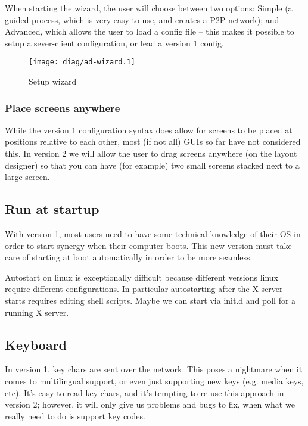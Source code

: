When starting the wizard, the user will choose between two options: Simple (a
guided process, which is very easy to use, and creates a P2P network); and
Advanced, which allows the user to load a config file -- this makes it possible
to setup a sever-client configuration, or lead a version 1 config.

\clearpage
\begin{figure}[ht!]
  \centering
  \texttt{[image: diag/ad-wizard.1]}
  \caption{Setup wizard}
  \label{fig:setupWizard}
\end{figure}

\subsubsection{Place screens anywhere}

While the version 1 configuration syntax does allow for screens to be placed at
positions relative to each other, most (if not all) GUIs so far have not 
considered this. In version 2 we will allow the user to drag screens anywhere
(on the layout designer) so that you can have (for example) two small screens
stacked next to a large screen.

\subsection{Run at startup}

With version 1, most users need to have some technical knowledge of their OS
in order to start synergy when their computer boots. This new version must
take care of starting at boot automatically in order to be more seamless.

Autostart on linux is exceptionally difficult because different versions linux 
require different configurations. In particular autostarting after the X server
starts requires editing shell scripts. Maybe we can start via init.d and poll 
for a running X server.

\subsection{Keyboard}

In version 1, key chars are sent over the network. This poses a nightmare when
it comes to multilingual support, or even just supporting new keys (e.g. media
keys, etc). It's easy to read key chars, and it's tempting to re-use this 
approach in version 2; however, it will only give us problems and bugs to fix,
when what we really need to do is support key codes.

